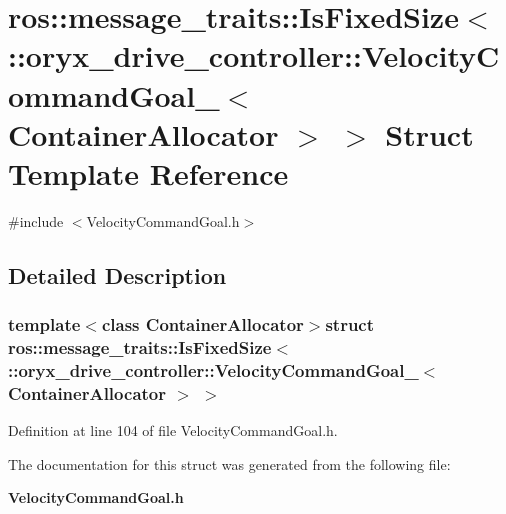 \section{ros\-:\-:message\-\_\-traits\-:\-:\-Is\-Fixed\-Size$<$ \-:\-:oryx\-\_\-drive\-\_\-controller\-:\-:\-Velocity\-Command\-Goal\-\_\-$<$ \-Container\-Allocator $>$ $>$ \-Struct \-Template \-Reference}
\label{structros_1_1message__traits_1_1IsFixedSize_3_01_1_1oryx__drive__controller_1_1VelocityCommandGoa7030fedadc561bd6a5152a39cff6716}


{\ttfamily \#include $<$\-Velocity\-Command\-Goal.\-h$>$}



\subsection{\-Detailed \-Description}
\subsubsection*{template$<$class Container\-Allocator$>$struct ros\-::message\-\_\-traits\-::\-Is\-Fixed\-Size$<$ \-::oryx\-\_\-drive\-\_\-controller\-::\-Velocity\-Command\-Goal\-\_\-$<$ Container\-Allocator $>$ $>$}



\-Definition at line 104 of file \-Velocity\-Command\-Goal.\-h.



\-The documentation for this struct was generated from the following file\-:\begin{DoxyCompactItemize}
\item 
{\bf \-Velocity\-Command\-Goal.\-h}\end{DoxyCompactItemize}
